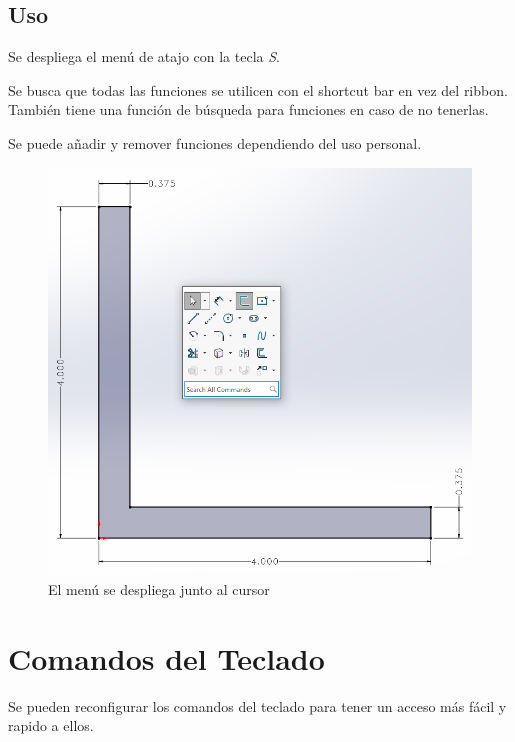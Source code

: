 \documentclass[12pt,letterpaper,final]{report}
\begin{document}
\section{Uso}

Se despliega el menú de atajo con la tecla \emph{S}.

Se busca que todas las funciones se utilicen con el shortcut bar en vez del ribbon. También tiene una función de búsqueda para funciones en caso de no tenerlas.

Se puede añadir y remover funciones dependiendo del uso personal.

\begin{figure}[H]
	\centering
	\includegraphics[width=0.85\linewidth, height=0.5\textheight,keepaspectratio]{Imagenes/solidworks_shortcutbars_07}
	\caption{El menú se despliega junto al cursor}
	\label{fig:solidworksshortcutbars07}
\end{figure}



\chapter{Comandos del Teclado}

Se pueden reconfigurar los comandos del teclado para tener un acceso más fácil y rapido a ellos.
\end{document}
